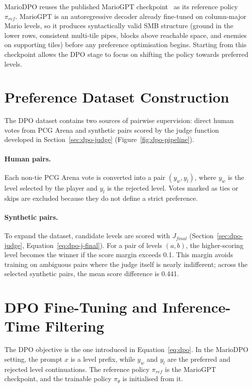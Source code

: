 \documentclass[shortabstract, mgr, english]{iithesis}
\begin{document}
MarioDPO reuses
the published MarioGPT checkpoint~\citep{sudhakaran2023mariogpt} as its
reference policy $\pi_{ref}$. MarioGPT is an autoregressive decoder already
fine-tuned on column-major Mario levels, so it produces syntactically valid SMB
structure (ground in the lower rows, consistent multi-tile pipes, blocks above
reachable space, and enemies on supporting tiles) before any preference
optimisation begins. Starting from this checkpoint allows the DPO stage
to focus on shifting the policy towards preferred levels.

\section{Preference Dataset Construction}
\label{sec:dpo-training}
\label{subsec:dpo-dataset}

The DPO dataset contains two sources of pairwise supervision: direct
human votes from PCG Arena and synthetic pairs scored by the judge function
developed in Section~\ref{sec:dpo-judge} (Figure~\ref{fig:dpo-pipeline}).

\paragraph{Human pairs.}
Each non-tie PCG Arena vote is converted into a pair $(y_w, y_l)$, where $y_w$ is
the level selected by the player and $y_l$ is the rejected level. Votes marked as
ties or skips are excluded because they do not define a strict preference.

\paragraph{Synthetic pairs.}
To expand the dataset, candidate levels are scored with $J_{final}$ (Section~\ref{sec:dpo-judge}, Equation~\ref{eq:dpo-j-final}). For a pair
of levels $(a,b)$, the higher-scoring level becomes the winner if the score
margin exceeds 0.1. This margin avoids training on ambiguous pairs where the
judge itself is nearly indifferent; across the selected synthetic pairs, the mean score difference is 0.441.

\section[DPO Fine-Tuning and Inference-Time Filtering]{DPO Fine-Tuning and Inference-Time Filtering}
\label{subsec:dpo-training-details}

The DPO objective is the one introduced in Equation~\ref{eq:dpo}. In the MarioDPO
setting, the prompt $x$ is a level prefix, while
$y_w$ and $y_l$ are the preferred and rejected level continuations. The
reference policy $\pi_{ref}$ is the MarioGPT checkpoint, and the trainable policy
$\pi_\theta$ is initialised from it.
\end{document}

